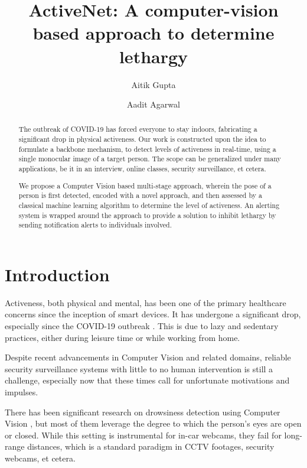 \documentclass[sigconf]{acmart}
\begin{document}
\title{ActiveNet: A computer-vision based approach to determine lethargy}
\author{Aitik Gupta}

\author{Aadit Agarwal}

\begin{abstract}


The outbreak of COVID-19 has forced everyone to stay indoors, fabricating a significant drop in physical activeness. Our work is constructed upon the idea to formulate a backbone mechanism, to detect levels of activeness in real-time, using a single monocular image of a target person. The scope can be generalized under many applications, be it in an interview, online classes, security surveillance, et cetera.

We propose a Computer Vision based multi-stage approach, wherein the pose of a person is first detected, encoded with a novel approach, and then assessed by a classical machine learning algorithm to determine the level of activeness. An alerting system is wrapped around the approach to provide a solution to inhibit lethargy by sending notification alerts to individuals involved.
\end{abstract}


\maketitle

\section{Introduction}
Activeness, both physical and mental, has been one of the primary healthcare concerns since the inception of smart devices. It has undergone a significant drop, especially since the COVID-19 outbreak \cite{mckibbin2020global}. This is due to lazy and sedentary practices, either during leisure time or while working from home.

Despite recent advancements in Computer Vision and related domains, reliable security surveillance systems with little to no human intervention \cite{4906450} is still a challenge, especially now that these times call for unfortunate motivations and impulses.

There has been significant research on drowsiness detection using Computer Vision \cite{6144162}, but most of them leverage the degree to which the person's eyes are open or closed. While this setting is instrumental for in-car webcams, they fail for long-range distances, which is a standard paradigm in CCTV footages, security webcams, et cetera.
\end{document}
